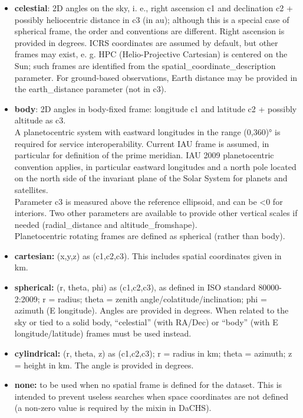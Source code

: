 \documentclass[11pt,a4paper]{ivoa}
\begin{document}
\begin{itemize}
\item \textbf{celestial}: 2D angles on the sky, i. e., right ascension c1 and declination c2 + possibly heliocentric distance in c3 (in au); although this is a special case of spherical frame, the order and conventions are different. Right ascension is provided in degrees. ICRS coordinates are assumed by default, but other frames may exist, e. g. HPC (Helio-Projective Cartesian) is centered on the Sun; such frames are identified from the spatial\_coordinate\_description parameter. For ground-based observations, Earth distance may be provided in the earth\_distance parameter (not in c3). 
\item \textbf{body}: 2D angles in body-fixed frame: longitude c1 and latitude c2 + possibly altitude as c3. \\A planetocentric system with eastward longitudes in the range (0,360)° is required for service interoperability. Current IAU frame is assumed, in particular for definition of the prime meridian. IAU 2009 planetocentric convention applies, in particular eastward longitudes and a north pole located on the north side of the invariant plane of the Solar System for planets and satellites.  \\Parameter c3 is measured above the reference ellipsoid, and can be <0 for interiors. Two other parameters are available to provide other vertical scales if needed (radial\_distance and altitude\_fromshape). \\Planetocentric rotating frames are defined as spherical (rather than body).
\item \textbf{cartesian:} (x,y,z) as (c1,c2,c3). This includes spatial coordinates given in km. 
\item \textbf{spherical:} (r, theta, phi) as (c1,c2,c3), as defined in ISO standard 80000-2:2009; r = radius; theta = zenith angle/colatitude/inclination; phi = azimuth (E longitude). Angles are provided in degrees. When related to the sky or tied to a solid body, ``celestial'' (with RA/Dec) or ``body'' (with E longitude/latitude) frames must be used instead.
\item \textbf{cylindrical:} (r, theta, z) as (c1,c2,c3); r = radius in km; theta = azimuth; z = height in km. The angle is provided in degrees.
\item \textbf{none:} to be used when no spatial frame is defined for the dataset. This is intended to prevent useless searches when space coordinates are not defined (a non-zero value is required by the mixin in DaCHS).
\end{itemize}
\end{document}

